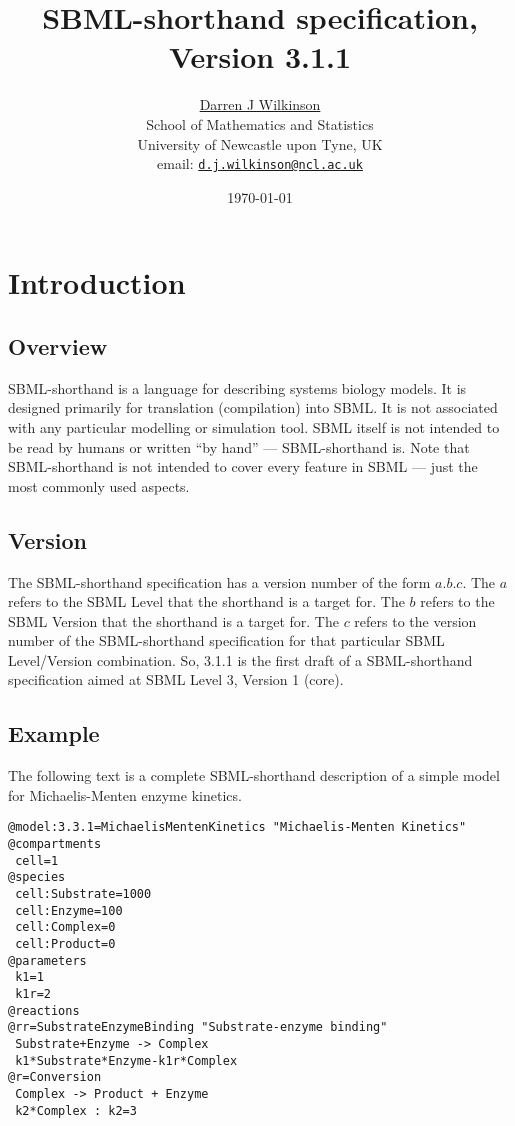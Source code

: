 \documentclass[11pt,a4paper]{article}
\title{SBML-shorthand specification, Version 3.1.1}
\author{\href{http://www.staff.ncl.ac.uk/d.j.wilkinson/}{Darren J
Wilkinson}\\
School of Mathematics and Statistics\\
University of Newcastle upon Tyne, UK\\
email: \href{mailto:d.j.wilkinson@ncl.ac.uk}{\texttt{d.j.wilkinson@ncl.ac.uk}}}
\date{\today}
\begin{document}
\sf
\maketitle

\tableofcontents

\newpage

\section{Introduction}

\subsection{Overview}

SBML-shorthand is a language for describing systems biology models. It
is designed primarily for translation (compilation) into SBML. It is
not associated with any particular modelling or simulation tool. SBML
itself is not intended to be read by humans or written ``by hand'' ---
SBML-shorthand is. Note that SBML-shorthand is not intended to cover
every feature in SBML --- just the most commonly used aspects.

\subsection{Version}

The SBML-shorthand specification has a version number of the form
$a.b.c$. The $a$ refers to the SBML Level that the shorthand is a
target for. The $b$ refers to the SBML Version that the shorthand is a
target for. The $c$ refers to the version number of the SBML-shorthand
specification for that particular SBML Level/Version combination. So,
3.1.1 is the first draft of a SBML-shorthand specification aimed at
SBML Level 3, Version 1 (core).

\subsection{Example}

The following text is a complete SBML-shorthand description of a
simple model for Michaelis-Menten enzyme kinetics.

{\small
\begin{verbatim}
@model:3.3.1=MichaelisMentenKinetics "Michaelis-Menten Kinetics"
@compartments
 cell=1
@species
 cell:Substrate=1000
 cell:Enzyme=100
 cell:Complex=0
 cell:Product=0
@parameters
 k1=1
 k1r=2
@reactions
@rr=SubstrateEnzymeBinding "Substrate-enzyme binding"
 Substrate+Enzyme -> Complex
 k1*Substrate*Enzyme-k1r*Complex
@r=Conversion
 Complex -> Product + Enzyme
 k2*Complex : k2=3
\end{verbatim}}
\end{document}
